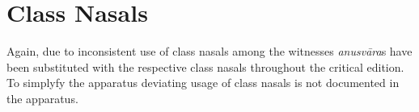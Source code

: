 \documentclass[11pt,showtrims]{memoir}
\begin{document}
\section{Class Nasals}

Again, due to inconsistent use of class nasals among the witnesses \textit{anusvāra}s have been substituted with the respective class nasals throughout the critical edition. To simplyfy the apparatus deviating usage of class nasals is not documented in the apparatus. 

\end{document}

